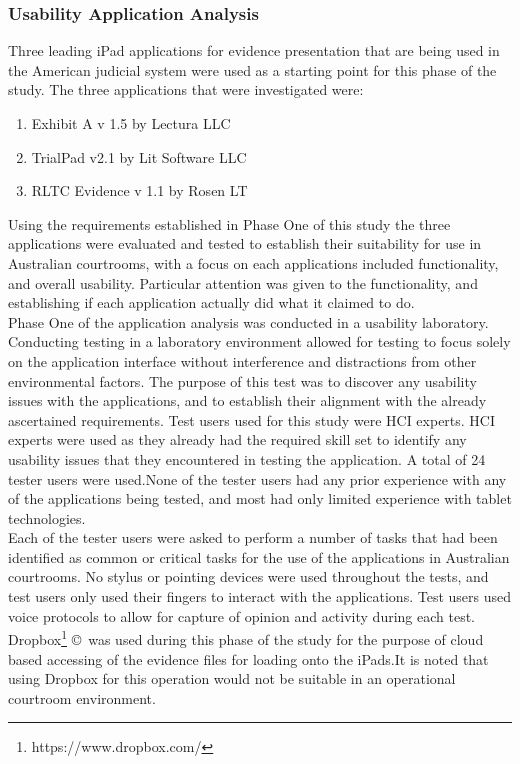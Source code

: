 \subsubsection{Usability Application Analysis}
Three leading iPad applications for evidence presentation that are being used in the American judicial system were used as a starting point for this phase of the study. The three applications that were investigated were:
\begin{enumerate}
    \item Exhibit A v 1.5 by Lectura LLC
    \item TrialPad v2.1 by Lit Software LLC
    \item RLTC Evidence v 1.1 by Rosen LT
\end{enumerate} 
Using the requirements established in Phase One of this study the three applications were evaluated and tested to establish their suitability for use in Australian courtrooms, with a focus on each applications included functionality, and overall usability. Particular attention was given to the functionality, and establishing if each application actually did what it claimed to do.\\
Phase One of the application analysis was conducted in a usability laboratory. Conducting testing in a laboratory environment allowed for testing to focus solely on the application interface without interference and distractions from other environmental factors.
The purpose of this test was to discover any usability issues with the applications, and to establish their alignment with the already ascertained requirements. Test users used for this study were HCI experts. HCI experts were used as they already had the required skill set to identify any usability issues that they encountered in testing the application. A total of 24 tester users were used.None of the tester users had any prior experience with any of the applications being tested, and most had only limited experience with tablet technologies.\\
Each of the tester users were asked to perform a number of tasks that had been identified as common or critical tasks for the use of the applications in Australian courtrooms. No stylus or pointing devices were used throughout the tests, and test users only used their fingers to interact with the applications. Test users used voice protocols to allow for capture of opinion and activity during each test. Dropbox\footnote{https://www.dropbox.com/} \copyright\   was used during this phase of the study for the purpose of cloud based accessing  of the  evidence files for loading onto the iPads.It is noted that using Dropbox for this operation would not be suitable in an operational courtroom environment.
